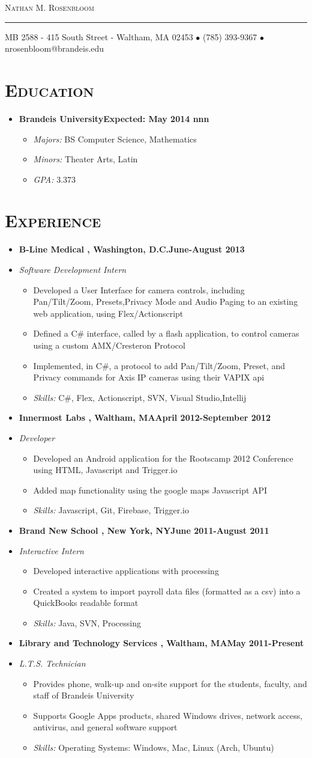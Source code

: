 \documentclass[11pt, oneside]{article}
\makeatletter
\newcommand{\lr}[2]{#1\hfill#2}
\newcommand{\name}{Nathan M. Rosenbloom}
\newcommand{\addr}{MB 2588 - 415 South Street - Waltham, MA 02453}
\newcommand{\phone}{(785) 393-9367}
\newcommand{\email}{nrosenbloom@brandeis.edu}
\newcommand{\resname}[4]{
  \begin{center}
    \selectfont\huge\scshape #1
    \normalfont
    \footnotesize
    \itshape
    \rule{\textwidth}{1pt}
    #2 $\bullet$ #3 $\bullet$ #4
    \normalfont
  \end{center}
}
\newcommand{\reseducation}[5]{
  \begin{ressection}{Education}
  \item[] \lr{\bfseries \selectfont #1\normalfont} {Expected: #2}
nnn    \vspace{-8pt}
    \begin{itemize} \itemsep-2pt
      \item[] \textsl{Majors: }#4
      \item[] \textsl{Minors: }#5
      \item[] \textsl{GPA: }#3
    \end{itemize}
  \end{ressection}
}
\newcommand{\skills}[1]{
\item[] \textsl{Skills:} #1
}
\newenvironment{ressection}[1]{
  \section{\normalsize \scshape \selectfont #1 \normalfont}
  \vspace{-4pt}
  \begin{itemize} \itemsep-2pt
}{
  \end{itemize}
  \vspace{-20pt}
}
\newenvironment{resitem}[4]{
\item[] \lr{\bfseries \selectfont #1 \normalfont, #2} {#3}
\item[] \textsl{#4}
  \vspace{-4pt}
  \begin{itemize} \itemsep-2pt
}{
  \end{itemize}
}
\makeatother
\begin{document}
\resname{\name}{\addr}{\phone}{\email}
\setcounter{secnumdepth}{-1} %
\reseducation{Brandeis University}{May 2014}{3.373}{BS Computer Science, Mathematics}{Theater Arts, Latin}
\begin{ressection}{Experience}
  \begin{resitem}{B-Line Medical}{Washington, D.C.}{June-August 2013}{Software Development Intern}
  \item Developed a User Interface for camera controls, including Pan/Tilt/Zoom, Presets,Privacy Mode and Audio Paging to an existing web application, using Flex/Actionscript
  \item Defined a C\# interface, called by a flash application, to control cameras using a custom AMX/Cresteron Protocol
  \item Implemented, in C\#, a protocol to add Pan/Tilt/Zoom, Preset, and Privacy commands for Axis IP cameras using their VAPIX api
    \skills{C\#, Flex, Actionscript, SVN, Visual Studio,Intellij}
  \end{resitem}
  \begin{resitem}{Innermost Labs}{Waltham, MA}{April 2012-September 2012}{Developer}
  \item Developed an Android application for the Rootscamp 2012 Conference using HTML, Javascript  and Trigger.io
  \item Added map functionality using the google maps Javascript API
    \skills{Javascript, Git, Firebase, Trigger.io}
  \end{resitem}
  \begin{resitem}{Brand New School}{New York, NY}{June 2011-August 2011}{Interactive Intern}
  \item Developed interactive applications with processing
  \item Created a system to import payroll data files (formatted as a csv) into a QuickBooks readable format
    \skills{Java, SVN, Processing}
  \end{resitem}
  \begin{resitem}{Library and Technology Services}{Waltham, MA}{May 2011-Present}{L.T.S. Technician} 
  \item Provides phone, walk-up and on-site support for the students, faculty, and staff of Brandeis University
  \item Supports Google Apps products, shared Windows drives, network access, antivirus, and general software support 
    \skills{Operating Systems: Windows, Mac, Linux (Arch, Ubuntu)}
  \end{resitem}
\end{ressection}
\end{document}
